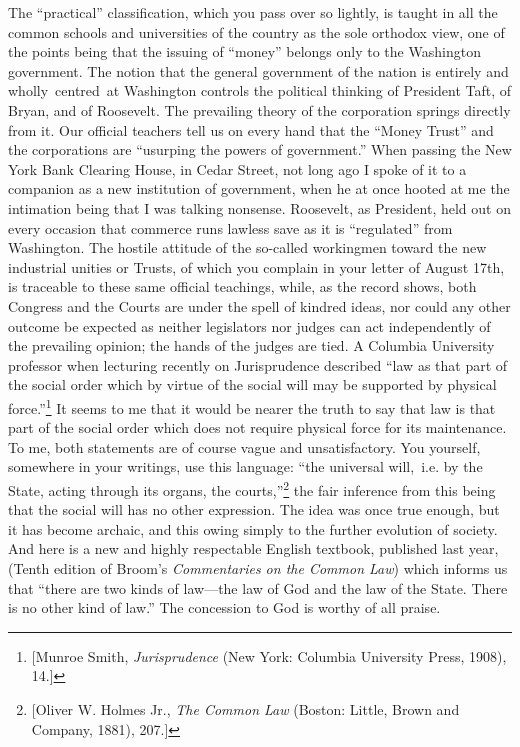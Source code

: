 \documentclass[twoside,symmetric,nobib,justified]{tufte-book}
\begin{document}
The ``practical'' classification, which you pass over so lightly, is
taught in all the common schools and universities of the country as the
sole orthodox view, one of the points being that the issuing of
``money'' belongs only to the Washington government. The notion that the
general government of the nation is entirely and wholly~centred~at
Washington controls the political thinking of President Taft, of Bryan,
and of Roosevelt. The prevailing theory of the corporation springs
directly from it. Our official teachers tell us on every hand that the
``Money Trust'' and the corporations are ``usurping the powers of
government.'' When passing the New York Bank Clearing House, in Cedar
Street, not long ago I spoke of it to a companion as a new institution
of government, when he at once hooted at me the intimation being that I
was talking nonsense. Roosevelt, as President, held out on every
occasion that commerce runs lawless save as it is ``regulated'' from
Washington. The hostile attitude of the so-called workingmen toward the
new industrial unities or Trusts, of which you complain in your letter
of August 17th, is traceable to these same official teachings, while, as
the record shows, both Congress and the Courts are under the spell of
kindred ideas, nor could any other outcome be expected as neither
legislators nor judges can act independently of the prevailing opinion;
the hands of the judges are tied. A Columbia University professor when
lecturing recently on Jurisprudence described ``law as that part of the
social order which by virtue of the social will may be supported by
physical force.''\footnote{{[}Munroe Smith, \emph{Jurisprudence} (New
  York: Columbia University Press, 1908), 14.{]}} It seems to me that it
would be nearer the truth to say that law is that part of the social
order which does not require physical force for its maintenance. To me,
both statements are of course vague and unsatisfactory. You yourself,
somewhere in your writings, use this language: ``the universal
will,~i.e. by the State, acting through its organs, the
courts,''\footnote{{[}Oliver W. Holmes Jr., \emph{The Common Law}
  (Boston: Little, Brown and Company, 1881), 207.{]}} the fair inference
from this being that the social will has no other expression. The idea
was once true enough, but it has become archaic, and this owing simply
to the further evolution of society. And here is a new and highly
respectable English textbook, published last year, (Tenth edition of
Broom's \emph{Commentaries on the Common Law}) which informs us that
``there are two kinds of law---the law of God and the law of the State.
There is no other kind of law.'' The concession to God is worthy of all
praise.~
\end{document}
